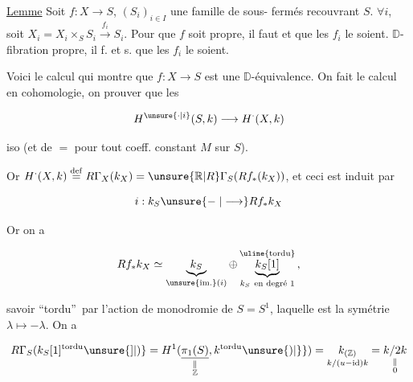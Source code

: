 
\uline{Lemme} Soit $f:X\to S$, $(S_i)_{i\in I}$ une famille de sous- fermés recouvrant $S$. $\forall i$, soit $X_i=X_i\times_S S_i\xrightarrow{f_i}S_i$. Pour que $f$ soit propre, il faut et que les $f_i$ le soient.  $\mathbb D$-fibration propre, il f. et s. que les $f_i$ le soient.



Voici  le  calcul qui montre que $f:X\to S$ est une $\mathbb D$-équivalence. On fait le calcul en cohomologie, on  prouver que les

\[
H^{\unsure{\cdot|i}}(S,k)\longrightarrow H^{\cdot}(X,k)
\]

iso (et de $=$ pour tout coeff. constant  $M$ sur $S$).

Or $H^{\cdot}(X,k)\overset{\mathrm{def}}=R\Gamma_X(k_X)=\unsure{\mathbb R|R}\Gamma_S(Rf_*(k_X))$, et ceci est induit par

\[
i:k_S\unsure{\relbar|\longrightarrow} Rf_*k_X
\]

Or on a

\[
Rf_*k_X\simeq\underbrace{k_S}_{\text{\unsure{im.}}(i)}\oplus
\underbrace{k_S[1]}_{k_S\ \text{en degré }1}^{\text{\uline{tordu}}}\,,
\]

savoir \textquotedblleft tordu\textquotedblright\ par l'action de monodromie de $S=S^1$, laquelle est la symétrie  $\lambda\longmapsto-\lambda$. On a

\[
R\Gamma_S(k_S[1]^{\text{tordu}}\unsure{]|)}=
H^1(\underset{\substack{\parallel\\\mathbb Z}}{\underline{\pi_1(S)}},k^{\text{tordu}}\unsure{)|\}} )=
\underset{\scriptstyle k/(u-\mathrm{id})k}{k_{(\mathbb Z)}}=\underset{\substack{\parallel\\0}}{k/2k}
\]

